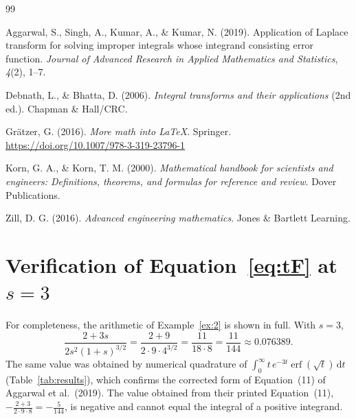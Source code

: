 \documentclass[12pt,a4paper]{article}
\theoremstyle{definition}
\theoremstyle{plain}
\theoremstyle{remark}
\newcommand{\erf}{\operatorname{erf}}
\newcommand{\dd}{\,\mathrm{d}}
\begin{document}
	\newpage
	\begin{thebibliography}{99}
		
		Aggarwal, S., Singh, A., Kumar, A., \& Kumar, N. (2019). Application of Laplace transform for solving improper integrals whose integrand consisting error function. \textit{Journal of Advanced Research in Applied Mathematics and Statistics}, \textit{4}(2), 1--7.
		
		Debnath, L., \& Bhatta, D. (2006). \textit{Integral transforms and their applications} (2nd ed.). Chapman \& Hall/CRC.
		
		Gr\"atzer, G. (2016). \textit{More math into \LaTeX}. Springer. \url{https://doi.org/10.1007/978-3-319-23796-1}
		
		Korn, G. A., \& Korn, T. M. (2000). \textit{Mathematical handbook for scientists and engineers: Definitions, theorems, and formulas for reference and review}. Dover Publications.
		
		Zill, D. G. (2016). \textit{Advanced engineering mathematics}. Jones \& Bartlett Learning.
		
	\end{thebibliography}
	
	\newpage
	\appendix
	\section{Verification of Equation~\eqref{eq:tF} at $s=3$}
	
	For completeness, the arithmetic of Example~\ref{ex:2} is shown in full. With $s=3$,
	\[
	\frac{2+3s}{2s^2(1+s)^{3/2}}=\frac{2+9}{2\cdot 9\cdot 4^{3/2}}=\frac{11}{18\cdot 8}=\frac{11}{144}\approx 0.076389 .
	\]
	The same value was obtained by numerical quadrature of $\int_0^\infty t\,e^{-3t}\erf(\sqrt{t})\dd t$ (Table~\ref{tab:results}), which confirms the corrected form of Equation~(11) of Aggarwal et al.\ (2019). The value obtained from their printed Equation~(11), $-\tfrac{2+3}{2\cdot 9\cdot 8}=-\tfrac{5}{144}$, is negative and cannot equal the integral of a positive integrand.
	
\end{document}
